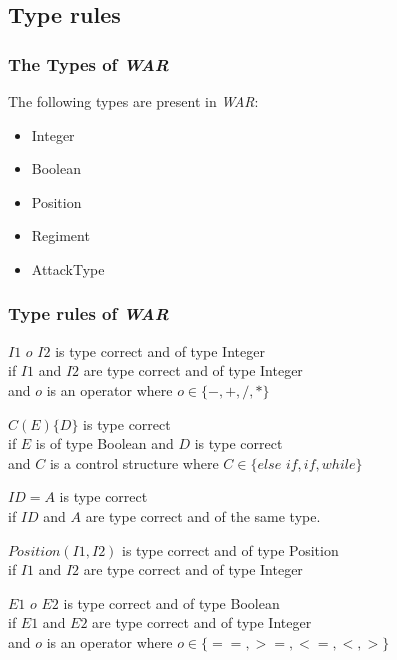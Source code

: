 \subsection{Type rules}
	\subsubsection{The Types of \textit{WAR}}
		The following types are present in \textit{WAR}: \\
		\begin{itemize}
			\item Integer
			\item Boolean
			\item Position
			\item Regiment
			\item AttackType
		\end{itemize}
		
	\subsubsection{Type rules of \textit{WAR}}

	\begin{typerule} 
		$I1$ $ o $ $I2$ is type correct and of type Integer \\
		if $I1$ and $I2$ are type correct and of type Integer \\
		and $o$ is an operator where $o\in \{-,+,/,* \}$
	\end{typerule}
	\begin{typerule} 
		$C(E)\{D\}$ is type correct\\
		if $E$ is of type Boolean and $D$ is type correct \\
		and $C$ is a control structure where $C \in \{else$ $if, if, while\}$
	\end{typerule}
	\begin{typerule} 
		$ID = A$ is type correct\\
		if $ID$ and $A$ are type correct and of the same type.
	\end{typerule}
	\begin{typerule} 
		$Position(I1,I2)$ is type correct and of type Position\\
		if $I1$ and $I2$ are type correct and of type Integer
	\end{typerule}
	\begin{typerule} 
		$E1$ $ o $ $E2$ is type correct and of type Boolean\\
		if $E1$ and $E2$ are type correct and of type Integer \\
		and $o$ is an operator where $o\in \{ ==,>=,<=,<,> \}$
	\end{typerule}